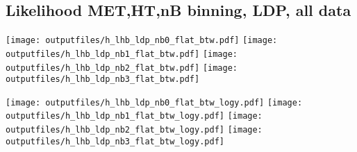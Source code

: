 \documentclass[11pt]{article}
\begin{document}
    \subsection{ Likelihood MET,HT,nB binning, LDP, all data}

    \noindent
     \texttt{[image: outputfiles/h\_lhb\_ldp\_nb0\_flat\_btw.pdf]}
     \texttt{[image: outputfiles/h\_lhb\_ldp\_nb1\_flat\_btw.pdf]}
     \texttt{[image: outputfiles/h\_lhb\_ldp\_nb2\_flat\_btw.pdf]}
     \texttt{[image: outputfiles/h\_lhb\_ldp\_nb3\_flat\_btw.pdf]}

    \noindent
     \texttt{[image: outputfiles/h\_lhb\_ldp\_nb0\_flat\_btw\_logy.pdf]}
     \texttt{[image: outputfiles/h\_lhb\_ldp\_nb1\_flat\_btw\_logy.pdf]}
     \texttt{[image: outputfiles/h\_lhb\_ldp\_nb2\_flat\_btw\_logy.pdf]}
     \texttt{[image: outputfiles/h\_lhb\_ldp\_nb3\_flat\_btw\_logy.pdf]}

   \clearpage





\end{document}
